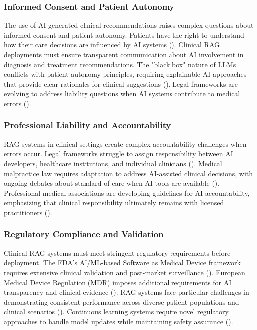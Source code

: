 \subsubsection{Informed Consent and Patient Autonomy}
The use of AI-generated clinical recommendations raises complex questions about informed consent and patient autonomy. Patients have the right to understand how their care decisions are influenced by AI systems (\citep{beauchamp2019principles}). Clinical RAG deployments must ensure transparent communication about AI involvement in diagnosis and treatment recommendations. The "black box" nature of LLMs conflicts with patient autonomy principles, requiring explainable AI approaches that provide clear rationales for clinical suggestions (\citep{holzinger2017makes}). Legal frameworks are evolving to address liability questions when AI systems contribute to medical errors (\citep{price2019black}).

\subsubsection{Professional Liability and Accountability}
RAG systems in clinical settings create complex accountability challenges when errors occur. Legal frameworks struggle to assign responsibility between AI developers, healthcare institutions, and individual clinicians (\citep{futoma2020myth}). Medical malpractice law requires adaptation to address AI-assisted clinical decisions, with ongoing debates about standard of care when AI tools are available (\citep{kesselheim2019artificial}). Professional medical associations are developing guidelines for AI accountability, emphasizing that clinical responsibility ultimately remains with licensed practitioners (\citep{ama2018augmented}).

\subsubsection{Regulatory Compliance and Validation}
Clinical RAG systems must meet stringent regulatory requirements before deployment. The FDA's AI/ML-based Software as Medical Device framework requires extensive clinical validation and post-market surveillance (\citep{fda2021artificial}). European Medical Device Regulation (MDR) imposes additional requirements for AI transparency and clinical evidence (\citep{eu2017mdr}). RAG systems face particular challenges in demonstrating consistent performance across diverse patient populations and clinical scenarios (\citep{sendak2020real}). Continuous learning systems require novel regulatory approaches to handle model updates while maintaining safety assurance (\citep{scott2021regulation}).


